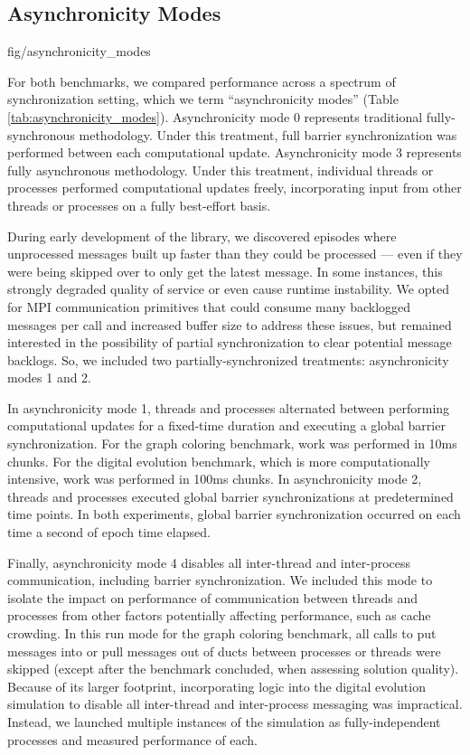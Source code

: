 \subsection{Asynchronicity Modes} \label{sec:asynchronicity_modes}

{fig/asynchronicity_modes}

For both benchmarks, we compared performance across a spectrum of synchronization setting, which we term ``asynchronicity modes'' (Table \ref{tab:asynchronicity_modes}).
Asynchronicity mode 0 represents traditional fully-synchronous methodology.
Under this treatment, full barrier synchronization was performed between each computational update.
Asynchronicity mode 3 represents fully asynchronous methodology.
Under this treatment, individual threads or processes performed computational updates freely, incorporating input from other threads or processes on a fully best-effort basis.

During early development of the library, we discovered episodes where unprocessed messages built up faster than they could be processed --- even if they were being skipped over to only get the latest message.
In some instances, this strongly degraded  quality of service or even cause runtime instability.
We opted for MPI communication primitives that could consume many backlogged messages per call and increased buffer size to address these issues, but remained interested in the possibility of partial synchronization to clear potential message backlogs.
So, we included two partially-synchronized treatments: asynchronicity modes 1 and 2.

In asynchronicity mode 1, threads and processes alternated between performing computational updates for a fixed-time duration and executing a global barrier synchronization.
For the graph coloring benchmark, work was performed in 10ms chunks.
For the digital evolution benchmark, which is more computationally intensive, work was performed in 100ms chunks.
In asynchronicity mode 2, threads and processes executed global barrier synchronizations at predetermined time points.
In both experiments, global barrier synchronization occurred on each time a second of epoch time elapsed.

Finally, asynchronicity mode 4 disables all inter-thread and inter-process communication, including barrier synchronization.
We included this mode to isolate the impact on performance of communication between threads and processes from other factors potentially affecting performance, such as cache crowding.
In this run mode for the graph coloring benchmark, all calls to put messages into or pull messages out of ducts between processes or threads were skipped (except after the benchmark concluded, when assessing solution quality).
Because of its larger footprint, incorporating logic into the digital evolution simulation to disable all inter-thread and inter-process messaging was impractical.
Instead, we launched multiple instances of the simulation as fully-independent processes and measured performance of each.
